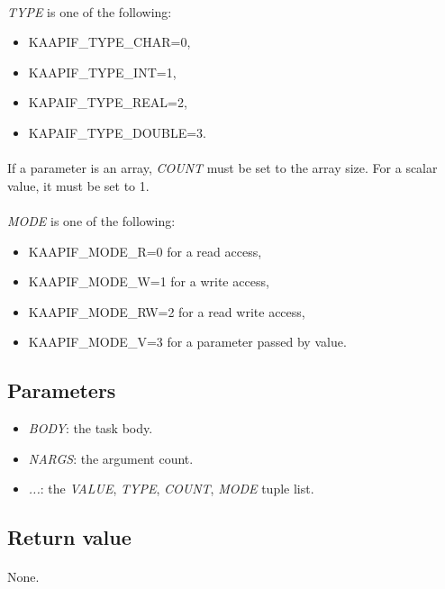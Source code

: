 \documentclass[a4paper, 11pt]{article}
\begin{document}
\paragraph{}
\textit{TYPE} is one of the following:
\begin{itemize}
\item KAAPIF\_TYPE\_CHAR=0,
\item KAAPIF\_TYPE\_INT=1,
\item KAPAIF\_TYPE\_REAL=2,
\item KAPAIF\_TYPE\_DOUBLE=3.
\end{itemize}

\paragraph{}
If a parameter is an array, \textit{COUNT} must be set to the array size.
For a scalar value, it must be set to 1.

\paragraph{}
\textit{MODE} is one of the following:
\begin{itemize}
\item KAAPIF\_MODE\_R=0 for a read access,
\item KAAPIF\_MODE\_W=1 for a write access,
\item KAAPIF\_MODE\_RW=2 for a read write access,
\item KAAPIF\_MODE\_V=3 for a parameter passed by value.
\end{itemize}

\subsection{Parameters}
\begin{itemize}
\item \textit{BODY}: the task body.
\item \textit{NARGS}: the argument count.
\item \textit{...}: the \textit{VALUE}, \textit{TYPE}, \textit{COUNT}, \textit{MODE} tuple list.
\end{itemize}

\subsection{Return value}
\paragraph{}
None.
\end{document}
